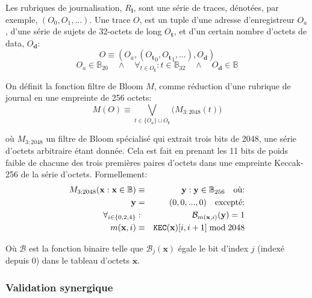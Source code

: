 \documentclass[9pt,oneside]{amsart}
\begin{document}
\begin{multicols}{2}
Les rubriques de journalisation, $R_\mathbf{l}$, sont une série de traces, dénotées, par exemple, $(O_0, O_1, ...)$. Une trace $O$, est un tuple d'une adresse d'enregistreur $O_a$, d'une série de sujets de 32-octets de long $O_\mathbf{t}$, et d'un certain nombre d'octets de data, $O_\mathbf{d}$:
\begin{equation}
O \equiv (O_a, ({O_\mathbf{t}}_0, {O_\mathbf{t}}_1, ...), O_\mathbf{d})
\end{equation}
\begin{equation}
O_a \in \mathbb{B}_{20} \quad \wedge \quad \forall_{t \in O_\mathbf{t}}: t \in \mathbb{B}_{32} \quad \wedge \quad O_\mathbf{d} \in \mathbb{B}
\end{equation}

On définit la fonction filtre de Bloom $M$, comme réduction d'une rubrique de journal en une empreinte de 256 octets:
\begin{equation}
M(O) \equiv \bigvee_{t \in \{O_a\} \cup O_\mathbf{t}} \big( M_{3:2048}(t) \big)
\end{equation}

où $M_{3:2048}$ un filtre de Bloom spécialisé qui extrait trois bits de 2048, une série d'octets arbitraire étant donnée. Cela est fait en prenant les 11 bits de poids faible de chacune des trois premières paires d'octets dans une empreinte Keccak-256 de la série d'octets. Formellement:
\begin{eqnarray}
M_{3:2048}(\mathbf{x}: \mathbf{x} \in \mathbb{B}) & \equiv & \mathbf{y}: \mathbf{y} \in \mathbb{B}_{256} \quad \text{où:}\\
\mathbf{y} & = & (0, 0, ..., 0) \quad \text{excepté:}\\
\forall_{i \in \{0, 2, 4\}}&:& \mathcal{B}_{m(\mathbf{x}, i)}(\mathbf{y}) = 1\\
m(\mathbf{x}, i) &\equiv& \mathtt{\tiny KEC}(\mathbf{x})[i, i + 1] \bmod 2048
\end{eqnarray}

Où $\mathcal{B}$ est la fonction binaire telle que $\mathcal{B}_j(\mathbf{x})$ égale le bit d'index $j$ (indexé depuis 0) dans le tableau d'octets $\mathbf{x}$.

\subsubsection{Validation synergique}


\end{multicols}
\end{document}
